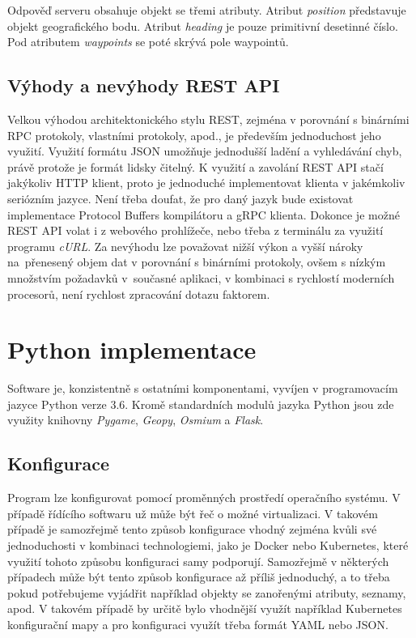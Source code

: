 \documentclass[czech, bachelor]{diploma}
\begin{document}
Odpověď serveru obsahuje objekt se třemi atributy. Atribut \emph{position} představuje objekt geografického bodu. Atribut
\emph{heading} je pouze primitivní desetinné číslo. Pod atributem \emph{waypoints} se poté skrývá pole waypointů.

\subsection{Výhody a nevýhody REST API}

Velkou výhodou architektonického stylu REST, zejména v porovnání s binárními RPC protokoly, vlastními protokoly, apod., je
především jednoduchost jeho využití. Využití formátu JSON umožňuje jednodušší ladění a vyhledávání chyb, právě protože je formát
lidsky čitelný. K využití a zavolání REST API stačí jakýkoliv HTTP klient, proto je jednoduché implementovat klienta v jakémkoliv
seriózním jazyce. Není třeba doufat, že pro daný jazyk bude existovat implementace Protocol Buffers kompilátoru a gRPC klienta.
Dokonce je možné REST API volat i z webového prohlížeče, nebo třeba z terminálu za využití programu \emph{cURL}. Za nevýhodu lze
považovat nižší výkon a vyšší nároky na~přenesený objem dat v porovnání s binárními protokoly, ovšem s nízkým množstvím požadavků
v~současné aplikaci, v kombinaci s rychlostí moderních procesorů, není rychlost zpracování dotazu faktorem.

\section{Python implementace}

Software je, konzistentně s ostatními komponentami, vyvíjen v programovacím jazyce Python verze 3.6. Kromě standardních modulů
jazyka Python jsou zde využity knihovny \emph{Pygame}, \emph{Geopy}, \emph{Osmium} a \emph{Flask}.

\subsection{Konfigurace}

Program lze konfigurovat pomocí proměnných prostředí operačního systému. V případě řídícího softwaru už může být řeč o možné
virtualizaci. V takovém případě je samozřejmě tento způsob konfigurace vhodný zejména kvůli své jednoduchosti v kombinaci
technologiemi, jako je Docker nebo Kubernetes, které využití tohoto způsobu konfiguraci samy podporují. Samozřejmě v některých
případech může být tento způsob konfigurace až příliš jednoduchý, a to třeba pokud potřebujeme vyjádřit například objekty
se zanořenými atributy, seznamy, apod. V takovém případě by určitě bylo vhodnější využít například Kubernetes konfigurační mapy
a pro konfiguraci využít třeba formát YAML nebo JSON.
\end{document}
